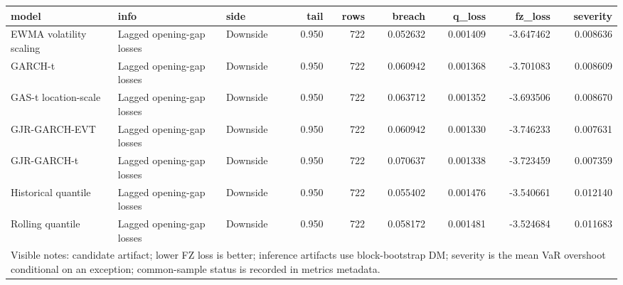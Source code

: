\begin{tabular}{lllrrrrrr}
\toprule
model & info & side & tail & rows & breach & q_loss & fz_loss & severity \\
\midrule
EWMA volatility scaling & Lagged opening-gap losses & Downside & 0.950 & 722 & 0.052632 & 0.001409 & -3.647462 & 0.008636 \\
GARCH-t & Lagged opening-gap losses & Downside & 0.950 & 722 & 0.060942 & 0.001368 & -3.701083 & 0.008609 \\
GAS-t location-scale & Lagged opening-gap losses & Downside & 0.950 & 722 & 0.063712 & 0.001352 & -3.693506 & 0.008670 \\
GJR-GARCH-EVT & Lagged opening-gap losses & Downside & 0.950 & 722 & 0.060942 & 0.001330 & -3.746233 & 0.007631 \\
GJR-GARCH-t & Lagged opening-gap losses & Downside & 0.950 & 722 & 0.070637 & 0.001338 & -3.723459 & 0.007359 \\
Historical quantile & Lagged opening-gap losses & Downside & 0.950 & 722 & 0.055402 & 0.001476 & -3.540661 & 0.012140 \\
Rolling quantile & Lagged opening-gap losses & Downside & 0.950 & 722 & 0.058172 & 0.001481 & -3.524684 & 0.011683 \\
\midrule
\multicolumn{9}{l}{\footnotesize Visible notes: candidate artifact; lower FZ loss is better; inference artifacts use block-bootstrap DM; severity is the mean VaR overshoot conditional on an exception; common-sample status is recorded in metrics metadata.} \\
\bottomrule
\end{tabular}
